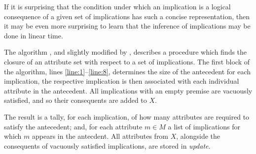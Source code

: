 If it is surprising that the condition under which an implication is a logical
consequence of a given set of implications has such a concise representation, then
it may be even more surprising to learn that the inference of implications may be
done in linear time.

The  algorithm \cite{maier1983chapter4}, and slightly
modified by \cite{ganter2016conceptual}, describes a procedure which finds the
closure of an attribute set with respect to a set of implications. The first block
of the algorithm, lines \ref{line:1}--\ref{line:8}, determines the size of the
antecedent for each implication, the respective implication is then associated with
each individual attribute in the antecedent. All implications with an empty
premise are vacuously satisfied, and so their consequents are added to $X$.

The result is a tally, for each implication, of how many attributes are required
to satisfy the antecedent; and, for each attribute $m \in M$ a list of implications
for which $m$ appears in the antecdent. All attributes from $X$, alongside the consequents
of vacuously satisfied implications, are stored in \textit{update}.

